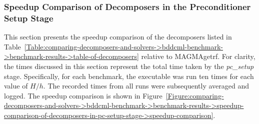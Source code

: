 \subsubsection{Speedup Comparison of Decomposers in the Preconditioner Setup Stage}\label{Subsection:comparing-decomposers-and-solvers->bddcml-benchmark->benchmark-results->speedup-comparison-of-decomposers-in-pc-setup-stage}
This section presents the speedup comparison of the decomposers listed in Table~\ref{Table:comparing-decomposers-and-solvers->bddcml-benchmark->benchmark-results->table-of-decomposers} relative to MAGMAgetrf. For clarity, the times discussed in this section represent the total time taken by the \textit{pc\_setup} stage. Specifically, for each benchmark, the  executable was run ten times for each value of $H/h$. The recorded times from all runs were subsequently averaged and logged. The speedup comparison is shown in Figure~\ref{Figure:comparing-decomposers-and-solvers->bddcml-benchmark->benchmark-results->speedup-comparison-of-decomposers-in-pc-setup-stage->speedup-comparison}.

